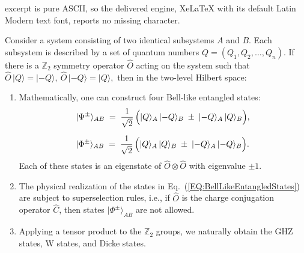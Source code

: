 \documentclass[10pt,a4paper]{amsart}
\begin{document}
excerpt is pure ASCII, so the delivered engine, XeLaTeX with its default Latin Modern text font, reports no missing character.
\begin{corollary}
	\label{COL:DiscreteSymmetryAndEntanglement}
	Consider a system consisting of two identical subsystems $A$ and $B$.
	Each subsystem is described by a set of quantum numbers $Q = (Q_1, Q_2, \dots, Q_n)$.
	If there is a $\mathbb{Z}_{2}$ symmetry operator $\hat{O}$ acting on the system such that
	$
	\hat{O}\,\lvert Q\rangle = \lvert -Q\rangle, 
	~
	\hat{O}\,\lvert -Q\rangle = \lvert Q\rangle,
	$
	then in the two-level Hilbert space:
	\begin{enumerate}
		\item Mathematically, one can construct four Bell-like entangled states:
		\begin{align}\label{EQ:BellLikeEntangledStates}
			\begin{aligned}
				&\lvert \Psi^{\pm} \rangle_{AB}
				\;=\;
				\frac{1}{\sqrt{2}}\,
				\Bigl(
				\lvert Q \rangle_A \,\lvert -Q \rangle_B
				\;\pm\;
				\lvert -Q \rangle_A \,\lvert Q \rangle_B
				\Bigr), \\[6pt]
				&\lvert \Phi^{\pm} \rangle_{AB}
				\;=\;
				\frac{1}{\sqrt{2}}\,
				\Bigl(
				\lvert Q \rangle_A \,\lvert Q \rangle_B
				\;\pm\;
				\lvert -Q \rangle_A \,\lvert -Q \rangle_B
				\Bigr).
			\end{aligned}
		\end{align}		
		Each of these states is an eigenstate of $\hat{O}\otimes \hat{O}$ with eigenvalue $\pm1$.
		
		\item The physical realization of the states in Eq.~(\ref{EQ:BellLikeEntangledStates}) are subject to superselection rules, i.e., if $\hat{O}$ is the charge conjugation operator $\hat{C}$, then states $\lvert \Phi^{\pm} \rangle_{AB}$ are not allowed.
		
		\item Applying a tensor product to the $\mathbb{Z}_{2}$ groups, we naturally obtain the GHZ states, W states, and Dicke states.
	\end{enumerate}
\end{corollary}
\end{document}
